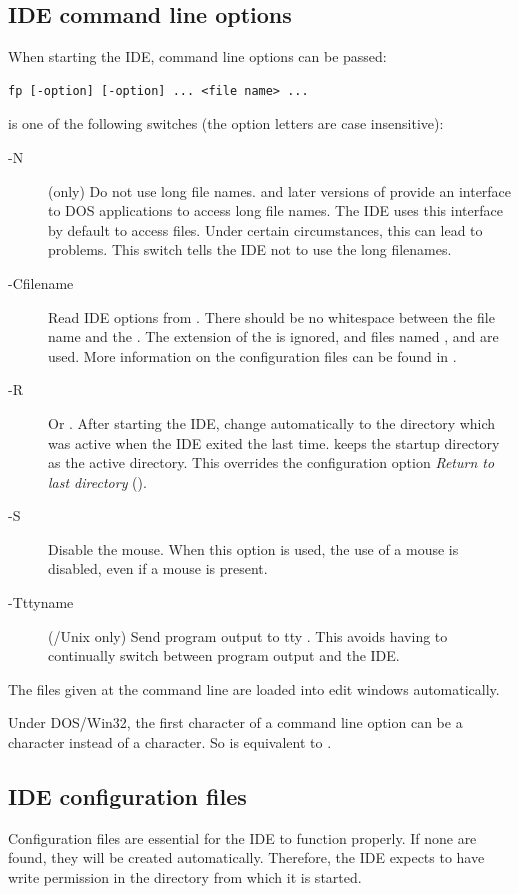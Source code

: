 \subsection{IDE command line options}
When starting the IDE, command line options can be passed:
\begin{verbatim}
fp [-option] [-option] ... <file name> ...
\end{verbatim}
 is one of the following switches (the option letters
are case insensitive):
\begin{description}
\item [-N] (\dos only) Do not use long file names.  and later
versions of \windows provide an interface to DOS applications to access
long file names.
The IDE uses this interface by default to access files. Under certain
circumstances, this can lead to problems. This switch tells the IDE not to
use the long filenames.
\item [-Cfilename] Read IDE options from . 
There should be no whitespace between the file name and the . The
extension of the  is ignored, and files named ,
 and  are used. More information on the
configuration files can be found in .
\item [-R] Or . After starting the IDE, change automatically to the
directory which was active when the IDE exited the last time.  keeps
the startup directory as the active directory. This overrides the configuration
option \emph{Return to last directory} ().
\item [-S] Disable the mouse. When this option is used, the use of a mouse is
disabled, even if a mouse is present.
\item[-Tttyname] (\linux/Unix only) Send program output to tty .
This avoids having to continually switch between program output and the IDE.
\end{description}
The files given at the command line are loaded into edit windows automatically.

\begin{remark}
Under DOS/Win32, the first character of a command line option can be a \var{/}
character instead of a \var{-} character. So  is equivalent to .
\end{remark}
%
%
\subsection{IDE configuration files}
\label{se:ideconfigfiles}
Configuration files are essential for the IDE to function properly. If none are
found, they will be created automatically. Therefore, the IDE expects to have
write permission in the directory from which it is started.

